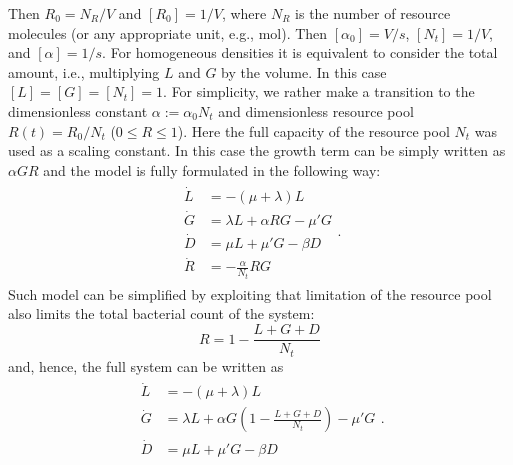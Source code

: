\documentclass[10pt,A4paper]{article}
\numberwithin{equation}{section}
\begin{document}
Then $R_0=N_R/V$ and $[R_0]=1/V$, where $N_R$ is the number of resource molecules (or any appropriate unit, e.g., mol).
Then $[\alpha_0]=V/s$, $[N_t]=1/V$, and $[\alpha]=1/s$.
For homogeneous densities it is equivalent to consider the total amount, i.e., multiplying $L$ and $G$ by the volume.
In this case $[L]=[G]=[N_t]=1$.
For simplicity, we rather make a transition to the dimensionless constant $\alpha:=\alpha_0 N_t$ and dimensionless resource pool $R(t) = R_0 / N_t$ ($0 \leqslant R \leqslant 1$).
Here the full capacity of the resource pool $N_t$ was used as a scaling constant.
In this case the growth term can be simply written as $\alpha G R$ and the model is fully formulated in the following way:
\begin{align}
    \begin{split}
        \dot{L} &= -(\mu + \lambda) L\\
        \dot{G} &= \lambda L + \alpha R G-\mu' G\\
        \dot{D} &= \mu  L + \mu' G- \beta D\\
        \dot{R} &= - \frac{\alpha}{N_t} R G
    \end{split}.
\label{eq:ode_3pool_resource} 
\end{align}
%
Such model can be simplified by exploiting that limitation of the resource pool also limits the total bacterial count of the system:
\begin{equation}
    R = 1 - \frac{L+G+D}{N_t}
\end{equation}
and, hence, the full system can be written as
\begin{align}
    \begin{split}
        \dot{L} &= -(\mu + \lambda) L\\
        \dot{G} &= \lambda L + \alpha G\left(1-\frac{L+G+D}{N_t}\right)-\mu' G\\
        \dot{D} &= \mu  L + \mu' G- \beta D 
    \end{split}.
\label{eq:ode_3pool_resource2} 
\end{align}
\end{document}

